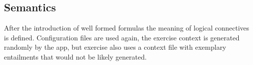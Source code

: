 %
%
%
%


%



%


\subsection{Semantics}

After the introduction of well formed formulas the meaning of logical connectives is defined.
Configuration files are used again, the exercise context is generated randomly by the app, 
but exercise  
also uses a context file with exemplary entailments that would not be likely generated.

